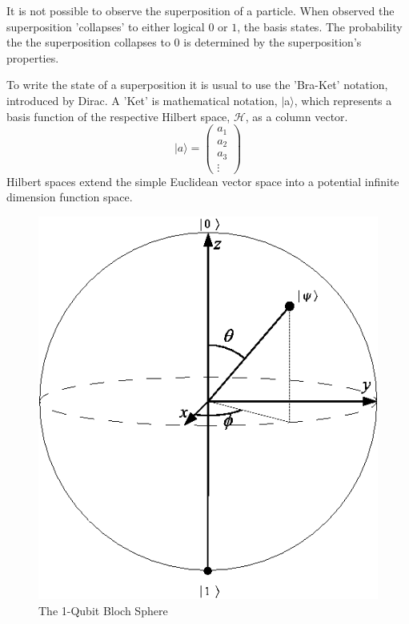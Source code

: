 \documentclass[authoryearcitations]{UoYCSproject}
\begin{document}
It is not possible to observe the superposition of a particle.
When observed the superposition 'collapses' to either logical $0$ or $1$, the basis states.
The probability the the superposition collapses to $0$ is determined by the superposition's properties.

To write the state of a superposition it is usual to use the 'Bra-Ket' notation, introduced by Dirac\cite{dirac2004principles}.
A 'Ket' is mathematical notation, $\vert$a$\rangle$, which represents a basis function of the respective Hilbert space, $\mathcal{H}$, as a column vector.
\begin{equation}
\vert
a
\rangle = 
\begin{pmatrix}
a_1\\
a_2\\
a_3\\
\vdots
\end{pmatrix}
\end{equation}
Hilbert spaces extend the simple Euclidean vector space into a potential infinite dimension function space.
\begin{figure}
\centering
\includegraphics[scale=0.5]{Bloch.png}
\caption{The 1-Qubit Bloch Sphere \cite{QuantikiBlochSphereImage}}
\label{BlochSphere}
\end{figure}
\end{document}
